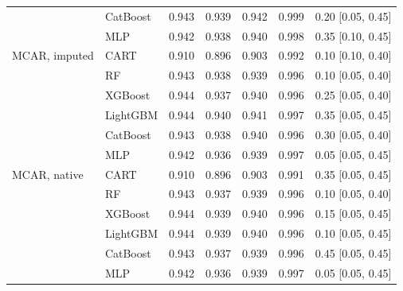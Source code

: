 \documentclass[pdflatex,sn-mathphys]{sn-jnl}
\theoremstyle{thmstyleone}
\begin{document}
\begin{table}[htbp]
\begin{tabular}{@{}llrrrrl@{}}
 & CatBoost & 0.943 & 0.939 & 0.942 & 0.999 & 0.20 [0.05, 0.45] \\
 & MLP & 0.942 & 0.938 & 0.940 & 0.998 & 0.35 [0.10, 0.45] \\
\midrule
MCAR, imputed & CART & 0.910 & 0.896 & 0.903 & 0.992 & 0.10 [0.10, 0.40] \\
 & RF & 0.943 & 0.938 & 0.939 & 0.996 & 0.10 [0.05, 0.40] \\
 & XGBoost & 0.944 & 0.937 & 0.940 & 0.996 & 0.25 [0.05, 0.40] \\
 & LightGBM & 0.944 & 0.940 & 0.941 & 0.997 & 0.35 [0.05, 0.45] \\
 & CatBoost & 0.943 & 0.938 & 0.940 & 0.996 & 0.30 [0.05, 0.40] \\
 & MLP & 0.942 & 0.936 & 0.939 & 0.997 & 0.05 [0.05, 0.45] \\
\midrule
MCAR, native & CART & 0.910 & 0.896 & 0.903 & 0.991 & 0.35 [0.05, 0.45] \\
 & RF & 0.943 & 0.937 & 0.939 & 0.996 & 0.10 [0.05, 0.40] \\
 & XGBoost & 0.944 & 0.939 & 0.940 & 0.996 & 0.15 [0.05, 0.45] \\
 & LightGBM & 0.944 & 0.939 & 0.940 & 0.996 & 0.10 [0.05, 0.45] \\
 & CatBoost & 0.943 & 0.937 & 0.939 & 0.996 & 0.45 [0.05, 0.45] \\
 & MLP & 0.942 & 0.936 & 0.939 & 0.997 & 0.05 [0.05, 0.45] \\
\bottomrule
\end{tabular}
\end{table}
\end{document}
